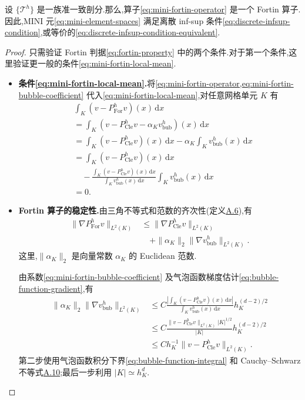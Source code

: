 \begin{theorem}\label{thm:mini-discrete-infsup}
设 $\{\mathcal{T}^h\}$ 是一族准一致剖分.那么,算子\cref{eq:mini-fortin-operator} 是一个 Fortin 算子.因此,MINI 元\cref{eq:mini-element-spaces} 满足离散 inf-sup 条件\cref{eq:discrete-infsup-condition},或等价的\cref{eq:discrete-infsup-condition-equivalent}.
\end{theorem}

\begin{proof}
只需验证 Fortin 判据\cref{eq:fortin-property} 中的两个条件.对于第一个条件,这里验证更一般的条件\cref{eq:mini-fortin-local-mean}.
\begin{itemize}
\item \textbf{条件\cref{eq:mini-fortin-local-mean}.}将\cref{eq:mini-fortin-operator,eq:mini-fortin-bubble-coefficient} 代入\cref{eq:mini-fortin-local-mean},对任意网格单元 $K$ 有
\[
\begin{aligned}
  &\int_K(v-P_{\mathrm{For}}^h v)(x)\,\mathrm{d}x\\
  &=\int_K(v-P_{\mathrm{Cle}}^h v-\alpha_Kv_{\mathrm{bub}}^h)(x)\,\mathrm{d}x\\
  &=\int_K(v-P_{\mathrm{Cle}}^h v)(x)\,\mathrm{d}x
       -\alpha_K\int_Kv_{\mathrm{bub}}^h(x)\,\mathrm{d}x\\
  &=\int_K(v-P_{\mathrm{Cle}}^h v)(x)\,\mathrm{d}x\\
  &\quad-\frac{\displaystyle\int_K(v-P_{\mathrm{Cle}}^h v)(x)\,\mathrm{d}x}
            {\displaystyle\int_Kv_{\mathrm{bub}}^h(x)\,\mathrm{d}x}
       \int_Kv_{\mathrm{bub}}^h(x)\,\mathrm{d}x\\
  &=0.
\end{aligned}
\]

\item \textbf{Fortin 算子的稳定性.}由三角不等式和范数的齐次性(定义\hyperref[def:appendix-a-6]{A.6}),有
\begin{equation}\label{eq:mini-fortin-gradient-bound}
\begin{aligned}
  \|\nabla P_{\mathrm{For}}^h v\|_{L^2(K)}
  &\le \|\nabla P_{\mathrm{Cle}}^h v\|_{L^2(K)}\\
  &\quad+\|\alpha_K\|_2\|\nabla v_{\mathrm{bub}}^h\|_{L^2(K)}.
\end{aligned}
\end{equation}
这里,$\|\alpha_K\|_2$ 是向量常数 $\alpha_K$ 的 Euclidean 范数.

由系数\cref{eq:mini-fortin-bubble-coefficient} 及气泡函数梯度估计\cref{eq:bubble-function-gradient},有
\[
\begin{aligned}
  \|\alpha_K\|_2\|\nabla v_{\mathrm{bub}}^h\|_{L^2(K)}
  &\le C\frac{\left|\displaystyle\int_K
       (v-P_{\mathrm{Cle}}^h v)(x)\,\mathrm{d}x\right|}
       {\displaystyle\int_Kv_{\mathrm{bub}}^h(x)\,\mathrm{d}x}
       h_K^{(d-2)/2}\\
  &\le C\frac{\|v-P_{\mathrm{Cle}}^h v\|_{L^2(K)}|K|^{1/2}}
       {|K|}h_K^{(d-2)/2}\\
  &\le C h_K^{-1}\|v-P_{\mathrm{Cle}}^h v\|_{L^2(K)}.
\end{aligned}
\]
第二步使用气泡函数积分下界\cref{eq:bubble-function-integral} 和 Cauchy--Schwarz 不等式\hyperref[eq:appendix-a-10]{A.10};最后一步利用 $|K|\simeq h_K^d$.


\end{itemize}
\end{proof}
